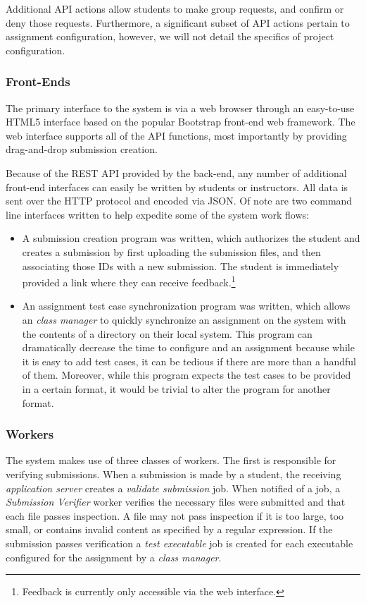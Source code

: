 Additional API actions allow students to make group requests, and confirm or
deny those requests. Furthermore, a significant subset of API actions pertain
to assignment configuration, however, we will not detail the specifics of
project configuration.

\subsubsection{Front-Ends}
The primary interface to the system is via a web browser through an easy-to-use
HTML5 interface based on the popular Bootstrap front-end web framework. The web
interface supports all of the API functions, most importantly by providing
drag-and-drop submission creation.

Because of the REST API provided by the back-end, any number of additional
front-end interfaces can easily be written by students or instructors. All data
is sent over the HTTP protocol and encoded via JSON. Of note are two command
line interfaces written to help expedite some of the system work flows:

\begin{itemize}
\item A submission creation program was written, which authorizes the student
  and creates a submission by first uploading the submission files, and then
  associating those IDs with a new submission. The student is immediately
  provided a link where they can receive feedback.\footnote{Feedback is
    currently only accessible via the web interface.}
\item An assignment test case synchronization program was written, which allows
  an \emph{class manager} to quickly synchronize an assignment on the system
  with the contents of a directory on their local system. This program can
  dramatically decrease the time to configure and an assignment because while
  it is easy to add test cases, it can be tedious if there are more than a
  handful of them. Moreover, while this program expects the test cases to be
  provided in a certain format, it would be trivial to alter the program for
  another format.
\end{itemize}

\subsubsection{Workers}
The system makes use of three classes of workers. The first is responsible for
verifying submissions. When a submission is made by a student, the receiving
\emph{application server} creates a \emph{validate submission} job. When
notified of a job, a \emph{Submission Verifier} worker verifies the necessary
files were submitted and that each file passes inspection. A file may not pass
inspection if it is too large, too small, or contains invalid content as
specified by a regular expression. If the submission passes verification a
\emph{test executable} job is created for each executable configured for the
assignment by a \emph{class manager}.

